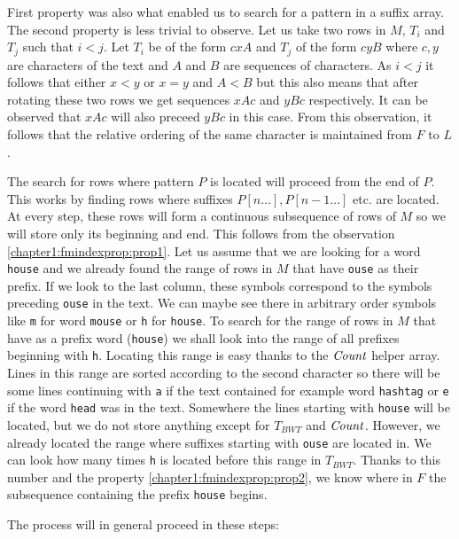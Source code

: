 First property was also what enabled us to search for a pattern in a suffix array.
The second property is less trivial to observe. Let us take two rows in $M$, $T_i$ and $T_j$
such that $i<j$. Let $T_i$ be of the form $cxA$ and $T_j$ of the form $cyB$ where $c, y$ are
characters of the text and $A$ and $B$ are sequences of characters. As $i<j$ it follows that
either $x<y$ or $x=y$ and $A<B$ but this also means that after rotating these two rows we get
sequences $xAc$ and $yBc$ respectively. It can be observed that $xAc$ will also preceed $yBc$
in this case. From this observation, it follows that the relative ordering of the same character
is maintained from $F$ to $L$.

The search for rows where pattern $P$ is located will proceed from the end of $P$. This works by
finding rows where suffixes $P[n\ldots], P[n-1\ldots]$ etc. are located. At every step, these
rows will form a continuous subsequence of rows of $M$ so we will store only its beginning and end.
This follows from the observation \ref{chapter1:fmindexprop:prop1}. Let us assume that we are
looking for a word {\tt house} and we already found the range of rows in $M$ that have {\tt ouse}
as their prefix. If we look to the last column, these symbols correspond to the symbols preceding
{\tt ouse} in the text. We can maybe see there in arbitrary order symbols like {\tt m} for word
{\tt mouse} or {\tt h} for {\tt house}. To search for the range of rows in $M$ that have as a prefix
word ({\tt house}) we shall look into the range of all prefixes beginning with {\tt h}. Locating this
range is easy thanks to the $\mathit{Count}$ helper array. Lines in this range are sorted according to the
second character so there will be some lines continuing with {\tt a} if the text contained for example
word {\tt hashtag} or {\tt e} if the word {\tt head} was in the text. Somewhere the lines starting with 
{\tt house} will be located, but we do not store anything except for $T_{BWT}$ and $\mathit{Count}$.
However, we already located the range where suffixes starting with {\tt ouse} are located in.
We can look how many times {\tt h} is located before this range in $T_{BWT}$. Thanks to this
number and the property \ref{chapter1:fmindexprop:prop2}, we know where in $F$ the subsequence
containing the prefix {\tt house} begins.


The process will in general proceed in these steps:

